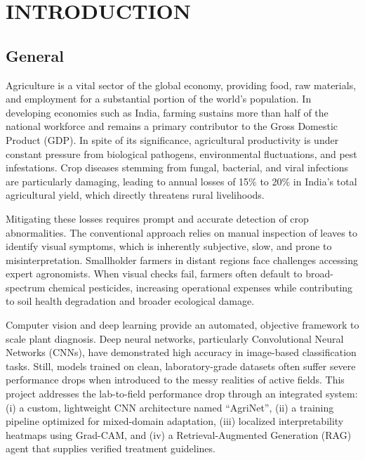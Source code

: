 \documentclass[12pt, a4paper]{report}
\begin{document}
\tableofcontents
\listoftables
\listoffigures

\clearpage
{}

\chapter{INTRODUCTION}

\section{General}
Agriculture is a vital sector of the global economy, providing food, raw materials, and employment for a substantial portion of the world's population. In developing economies such as India, farming sustains more than half of the national workforce and remains a primary contributor to the Gross Domestic Product (GDP). In spite of its significance, agricultural productivity is under constant pressure from biological pathogens, environmental fluctuations, and pest infestations. Crop diseases stemming from fungal, bacterial, and viral infections are particularly damaging, leading to annual losses of 15\% to 20\% in India's total agricultural yield, which directly threatens rural livelihoods.

Mitigating these losses requires prompt and accurate detection of crop abnormalities. The conventional approach relies on manual inspection of leaves to identify visual symptoms, which is inherently subjective, slow, and prone to misinterpretation. Smallholder farmers in distant regions face challenges accessing expert agronomists. When visual checks fail, farmers often default to broad-spectrum chemical pesticides, increasing operational expenses while contributing to soil health degradation and broader ecological damage.

Computer vision and deep learning provide an automated, objective framework to scale plant diagnosis. Deep neural networks, particularly Convolutional Neural Networks (CNNs), have demonstrated high accuracy in image-based classification tasks. Still, models trained on clean, laboratory-grade datasets often suffer severe performance drops when introduced to the messy realities of active fields. This project addresses the lab-to-field performance drop through an integrated system: (i) a custom, lightweight CNN architecture named ``AgriNet'', (ii) a training pipeline optimized for mixed-domain adaptation, (iii) localized interpretability heatmaps using Grad-CAM, and (iv) a Retrieval-Augmented Generation (RAG) agent that supplies verified treatment guidelines.
\end{document}
